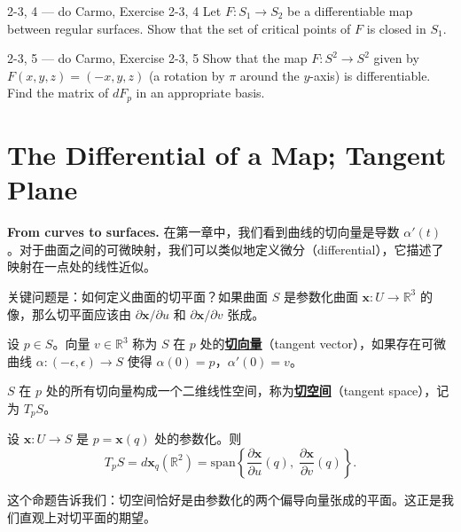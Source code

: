 \begin{exercise}{2-3, 4 — do Carmo, Exercise 2-3, 4}
Let $F: S_1 \to S_2$ be a differentiable map between regular surfaces. Show that the set of critical points of $F$ is closed in $S_1$.
\end{exercise}

\begin{exercise}{2-3, 5 — do Carmo, Exercise 2-3, 5}
Show that the map $F: S^2 \to S^2$ given by $F(x,y,z) = (-x,y,z)$ (a rotation by $\pi$ around the $y$-axis) is differentiable. Find the matrix of $dF_p$ in an appropriate basis.
\end{exercise}

\section{The Differential of a Map; Tangent Plane}\label{sec:differential-tangent-plane}

\textbf{From curves to surfaces.} 在第一章中，我们看到曲线的切向量是导数 $\alpha'(t)$。对于曲面之间的可微映射，我们可以类似地定义微分（differential），它描述了映射在一点处的线性近似。

关键问题是：如何定义曲面的切平面？如果曲面 $S$ 是参数化曲面 $\mathbf{x}: U \to \mathbb{R}^3$ 的像，那么切平面应该由 $\partial\mathbf{x}/\partial u$ 和 $\partial\mathbf{x}/\partial v$ 张成。

\begin{Definition}[切向量]\label{def:tangent-vector-surface}
设 $p \in S$。向量 $v \in \mathbb{R}^3$ 称为 $S$ 在 $p$ 处的\textbf{\underline{切向量}}（tangent vector），如果存在可微曲线 $\alpha: (-\epsilon, \epsilon) \to S$ 使得 $\alpha(0) = p$，$\alpha'(0) = v$。
\end{Definition}

$S$ 在 $p$ 处的所有切向量构成一个二维线性空间，称为\textbf{\underline{切空间}}（tangent space），记为 $T_pS$。

\begin{Proposition}[切空间的构造]\label{prop:tangent-space}
设 $\mathbf{x}: U \to S$ 是 $p = \mathbf{x}(q)$ 处的参数化。则
\[
T_pS = d\mathbf{x}_q(\mathbb{R}^2) = \text{span}\left\{\frac{\partial\mathbf{x}}{\partial u}(q),\; \frac{\partial\mathbf{x}}{\partial v}(q)\right\}.
\]
\end{Proposition}

这个命题告诉我们：切空间恰好是由参数化的两个偏导向量张成的平面。这正是我们直观上对切平面的期望。

